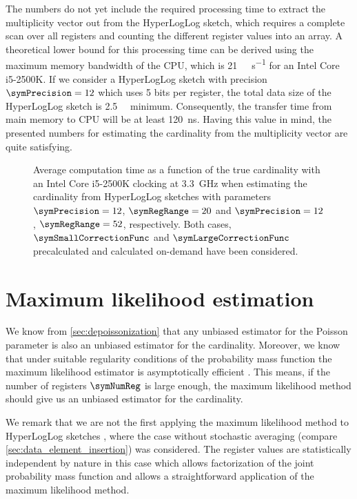\documentclass[a4paper]{scrartcl}
\begin{document}
The numbers do not yet include the required processing time to extract the multiplicity vector out from the HyperLogLog sketch, which requires a complete scan over all registers and counting the different register values into an array. A theoretical lower bound for this processing time can be derived using the maximum memory bandwidth of the CPU, which is \SI[per-mode=symbol]{21}{\giga\byte\per\second} for an Intel Core i5-2500K. If we consider a HyperLogLog sketch with precision $\symPrecision=12$ which uses 5 bits per register, the total data size of the HyperLogLog sketch is \SI{2.5}{\kilo\byte} minimum. Consequently, the transfer time from main memory to CPU will be at least \SI{120}{\nano\second}. Having this value in mind, the presented numbers for estimating the cardinality from the multiplicity vector are quite satisfying. 

\begin{figure}
\centering

\caption{Average computation time as a function of the true cardinality with an Intel Core i5-2500K clocking at \SI{3.3}{\giga\hertz} when estimating the cardinality from HyperLogLog sketches with parameters $\symPrecision=12$, $\symRegRange=20$ and $\symPrecision=12$, $\symRegRange=52$, respectively. Both cases, $\symSmallCorrectionFunc$ and $\symLargeCorrectionFunc$ precalculated and calculated on-demand have been considered.}
\label{fig:corrected_raw_avg_exec_time}
\end{figure}

\section{Maximum likelihood estimation}
We know from \cref{sec:depoissonization} that any unbiased estimator for the Poisson parameter is also an unbiased estimator for the cardinality. Moreover, we know that under suitable regularity conditions of the probability mass function the maximum likelihood estimator is asymptotically efficient \cite{Casella2002}. This means, if the number of registers $\symNumReg$ is large enough, the maximum likelihood method should give us an unbiased estimator for the cardinality.

We remark that we are not the first applying the maximum likelihood method to HyperLogLog sketches \cite{Clifford2012}, where the case without stochastic averaging (compare \cref{sec:data_element_insertion}) was considered. The register values are statistically independent by nature in this case which 
allows factorization of the joint probability mass function and allows a straightforward application of the maximum likelihood method. 
\end{document}
